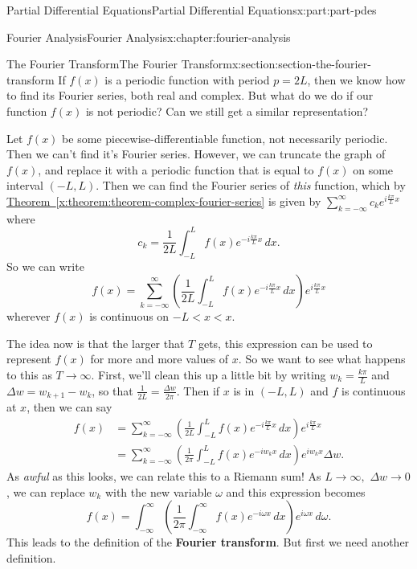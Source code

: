 \documentclass[oneside,10pt,]{book}
\newcommand{\xreffont}{\relax}
\newcommand{\terminology}[1]{\textbf{#1}}
\numberwithin{equation}{part}
\newcommand{\lt}{<}
\newcommand{\amp}{&}
\begin{document}
\begin{partptx}{Partial Differential Equations}{}{Partial Differential Equations}{}{}{x:part:part-pdes}
\begin{chapterptx}{Fourier Analysis}{}{Fourier Analysis}{}{}{x:chapter:fourier-analysis}
\begin{sectionptx}{The Fourier Transform}{}{The Fourier Transform}{}{}{x:section:section-the-fourier-transform}
If \(f(x)\) is a periodic function with period \(p=2L\), then we know how to find its Fourier series, both real and complex. But what do we do if our function \(f(x)\) is not periodic? Can we still get a similar representation?%
\par
Let \(f(x)\) be some piecewise-differentiable function, not necessarily periodic. Then we can't find it's Fourier series. However, we can truncate the graph of \(f(x)\), and replace it with a periodic function that is equal to \(f(x)\) on some interval \((-L,L)\). Then we can find the Fourier series of \emph{this} function, which by \hyperref[x:theorem:theorem-complex-fourier-series]{Theorem~{\xreffont\ref{x:theorem:theorem-complex-fourier-series}}} is given by \(\sum_{k=-\infty}^{\infty}c_{k}e^{i\frac{k\pi}{L}x}\) where%
\begin{equation*}
c_{k} = \frac{1}{2L}\int_{-L}^{L}f(x)e^{-i\frac{k\pi}{L}x}\,dx.
\end{equation*}
So we can write%
\begin{equation*}
f(x) = \sum_{k=-\infty}^{\infty}\left(\frac{1}{2L}\int_{-L}^{L}f(x)e^{-i\frac{k\pi}{L}x}\,dx\right)e^{i\frac{k\pi}{L}x}
\end{equation*}
wherever \(f(x)\) is continuous on \(-L \lt x \lt x\).%
\par
The idea now is that the larger that \(T\) gets, this expression can be used to represent \(f(x)\) for more and more values of \(x\). So we want to see what happens to this as \(T\to\infty\). First, we'll clean this up a little bit by writing \(w_{k} = \frac{k\pi}{L}\) and \(\Delta w = w_{k+1} - w_{k}\), so that \(\frac{1}{2L} = \frac{\Delta w}{2\pi}\). Then if \(x\) is in \((-L,L)\) and \(f\) is continuous at \(x\), then we can say%
\begin{align*}
f(x) \amp = \sum_{k=-\infty}^{\infty}\left(\frac{1}{2L}\int_{-L}^{L}f(x)e^{-i\frac{k\pi}{L}x}\,dx\right)e^{i\frac{k\pi}{L}x} \\
\amp = \sum_{k=-\infty}^{\infty}\left(\frac{1}{2\pi}\int_{-L}^{L}f(x)e^{-iw_{k}x}\,dx\right)e^{iw_{k}x}\Delta w. 
\end{align*}
As \emph{awful} as this looks, we can relate this to a Riemann sum! As \(L\to\infty,\) \(\Delta w\to0\), we can replace \(w_{k}\) with the new variable \(\omega\) and this expression becomes%
\begin{equation*}
f(x) = \int_{-\infty}^{\infty}\left(\frac{1}{2\pi}\int_{-\infty}^{\infty}f(x)e^{-i\omega x}\,dx\right)e^{i\omega x}\,d\omega.
\end{equation*}
This leads to the definition of the \terminology{Fourier transform}. But first we need another definition.%

\end{sectionptx}
\end{chapterptx}
\end{partptx}
\end{document}
